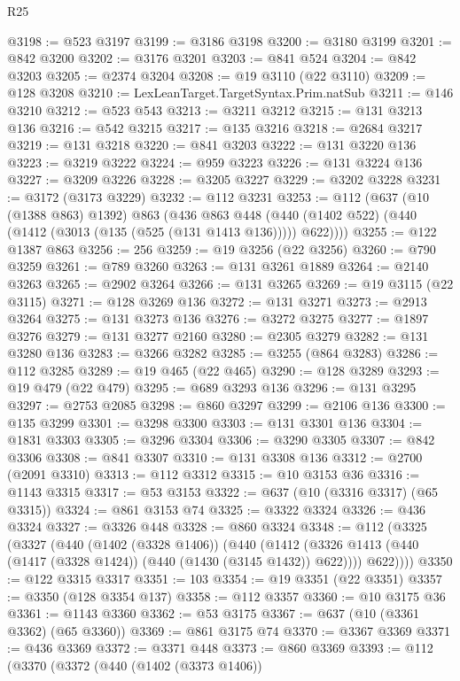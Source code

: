\begin{lexlean}{R25}
\begin{coremodule}
{{{{{{{{{{{{{{{{{{{{{{{{{{{{{{{{{{{{{{{{{{{{{{{{{{{{{{{{{{{{{{{{{{{{{{{{{{{{{{{{{{{{{{{{{{{{{{{{{{{{{{{{{{{{{{{{{{{{{{{{{{{{{{{{{{{{{{{{{{{{{{{{{{{{{{{{{{{{{{{{{{{{{{{{{{{{{{{{{{{{{{{{{{{{{{{{{{{{{{{@3198 := @523 @3197
@3199 := @3186 @3198
@3200 := @3180 @3199
@3201 := @842 @3200
@3202 := @3176 @3201
@3203 := @841 @524
@3204 := @842 @3203
@3205 := @2374 @3204
@3208 := @19 @3110 (@22 @3110)
@3209 := @128 @3208
@3210 := LexLeanTarget.TargetSyntax.Prim.natSub
@3211 := @146 @3210
@3212 := @523 @543
@3213 := @3211 @3212
@3215 := @131 @3213 @136
@3216 := @542 @3215
@3217 := @135 @3216
@3218 := @2684 @3217
@3219 := @131 @3218
@3220 := @841 @3203
@3222 := @131 @3220 @136
@3223 := @3219 @3222
@3224 := @959 @3223
@3226 := @131 @3224 @136
@3227 := @3209 @3226
@3228 := @3205 @3227
@3229 := @3202 @3228
@3231 := @3172 (@3173 @3229)
@3232 := @112 @3231
@3253 := @112
    (@637
      (@10 (@1388 @863) @1392)
      @863
      (@436
        @863
        @448
        (@440 (@1402 @522) (@440 (@1412 (@3013 (@135 (@525 (@131 @1413 @136))))) @622))))
@3255 := @122 @1387 @863
@3256 := 256
@3259 := @19 @3256 (@22 @3256)
@3260 := @790 @3259
@3261 := @789 @3260
@3263 := @131 @3261 @1889
@3264 := @2140 @3263
@3265 := @2902 @3264
@3266 := @131 @3265
@3269 := @19 @3115 (@22 @3115)
@3271 := @128 @3269 @136
@3272 := @131 @3271
@3273 := @2913 @3264
@3275 := @131 @3273 @136
@3276 := @3272 @3275
@3277 := @1897 @3276
@3279 := @131 @3277 @2160
@3280 := @2305 @3279
@3282 := @131 @3280 @136
@3283 := @3266 @3282
@3285 := @3255 (@864 @3283)
@3286 := @112 @3285
@3289 := @19 @465 (@22 @465)
@3290 := @128 @3289
@3293 := @19 @479 (@22 @479)
@3295 := @689 @3293 @136
@3296 := @131 @3295
@3297 := @2753 @2085
@3298 := @860 @3297
@3299 := @2106 @136
@3300 := @135 @3299
@3301 := @3298 @3300
@3303 := @131 @3301 @136
@3304 := @1831 @3303
@3305 := @3296 @3304
@3306 := @3290 @3305
@3307 := @842 @3306
@3308 := @841 @3307
@3310 := @131 @3308 @136
@3312 := @2700 (@2091 @3310)
@3313 := @112 @3312
@3315 := @10 @3153 @36
@3316 := @1143 @3315
@3317 := @53 @3153
@3322 := @637 (@10 (@3316 @3317) (@65 @3315))
@3324 := @861 @3153 @74
@3325 := @3322 @3324
@3326 := @436 @3324
@3327 := @3326 @448
@3328 := @860 @3324
@3348 := @112
    (@3325
      (@3327
        (@440
          (@1402 (@3328 @1406))
          (@440
            (@1412 (@3326 @1413 (@440 (@1417 (@3328 @1424)) (@440 (@1430 (@3145 @1432)) @622))))
            @622))))
@3350 := @122 @3315 @3317
@3351 := 103
@3354 := @19 @3351 (@22 @3351)
@3357 := @3350 (@128 @3354 @137)
@3358 := @112 @3357
@3360 := @10 @3175 @36
@3361 := @1143 @3360
@3362 := @53 @3175
@3367 := @637 (@10 (@3361 @3362) (@65 @3360))
@3369 := @861 @3175 @74
@3370 := @3367 @3369
@3371 := @436 @3369
@3372 := @3371 @448
@3373 := @860 @3369
@3393 := @112
    (@3370
      (@3372
        (@440
          (@1402 (@3373 @1406))
}}}}}}}}}}}}}}}}}}}}}}}}}}}}}}}}}}}}}}}}}}}}}}}}}}}}}}}}}}}}}}}}}}}}}}}}}}}}}}}}}}}}}}}}}}}}}}}}}}}}}}}}}}}}}}}}}}}}}}}}}}}}}}}}}}}}}}}}}}}}}}}}}}}}}}}}}}}}}}}}}}}}}}}}}}}}}}}}}}}}}}}}}}}}}}}}}}}}}}}
\end{coremodule}
\end{lexlean}
